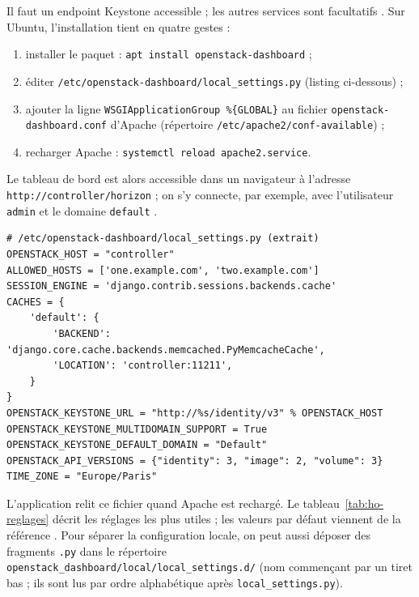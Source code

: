 Il faut un endpoint Keystone accessible ; les autres services sont facultatifs \parencite{horizon-requirements}. Sur Ubuntu,
l'installation tient en quatre gestes \parencite{horizon-install} :

\begin{enumerate}
  \item installer le paquet : \texttt{apt install openstack-dashboard} ;
  \item éditer \texttt{/etc/\allowbreak openstack-dashboard/\allowbreak local\_\allowbreak settings.py} (listing ci-dessous) ;
  \item ajouter la ligne \texttt{WSGIApplicationGroup \%\{GLOBAL\}} au fichier \texttt{openstack-dashboard.conf} d'Apache
        (répertoire \texttt{/etc/apache2/conf-available}) ;
  \item recharger Apache : \texttt{systemctl reload apache2.service}.
\end{enumerate}

Le tableau de bord est alors accessible dans un navigateur à l'adresse \texttt{http://controller/horizon} ; on s'y connecte,
par exemple, avec l'utilisateur \texttt{admin} et le domaine \texttt{default} \parencite{horizon-verify}.

\par\noindent\begin{minipage}{\linewidth}
\begin{lstlisting}
# /etc/openstack-dashboard/local_settings.py (extrait)
OPENSTACK_HOST = "controller"
ALLOWED_HOSTS = ['one.example.com', 'two.example.com']
SESSION_ENGINE = 'django.contrib.sessions.backends.cache'
CACHES = {
    'default': {
        'BACKEND': 'django.core.cache.backends.memcached.PyMemcacheCache',
        'LOCATION': 'controller:11211',
    }
}
OPENSTACK_KEYSTONE_URL = "http://%s/identity/v3" % OPENSTACK_HOST
OPENSTACK_KEYSTONE_MULTIDOMAIN_SUPPORT = True
OPENSTACK_KEYSTONE_DEFAULT_DOMAIN = "Default"
OPENSTACK_API_VERSIONS = {"identity": 3, "image": 2, "volume": 3}
TIME_ZONE = "Europe/Paris"
\end{lstlisting}
\end{minipage}\par

L'application relit ce fichier quand Apache est rechargé. Le tableau~\ref{tab:ho-reglages} décrit les réglages les plus
utiles ; les valeurs par défaut viennent de la référence \parencite{horizon-settings}. Pour séparer la configuration locale,
on peut aussi déposer des fragments \texttt{.py} dans le répertoire \texttt{openstack\_\allowbreak dashboard/local/local\_\allowbreak settings.d/}
(nom commençant par un tiret bas ; ils sont lus par ordre alphabétique après \texttt{local\_\allowbreak settings.py}).


